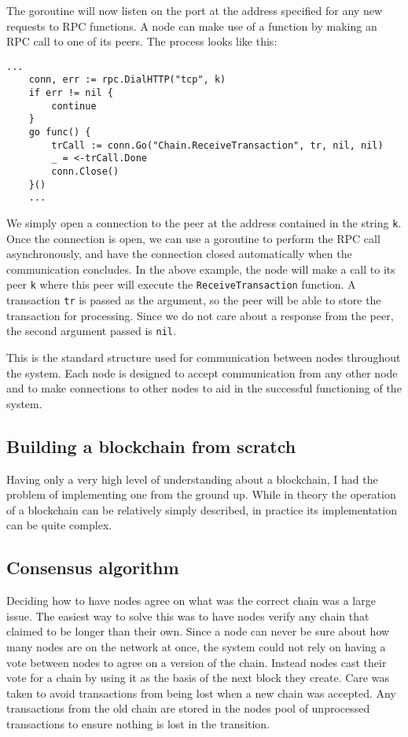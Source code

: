 \documentclass[a4paper,12pt]{article}
\begin{document}
The goroutine will now listen on the port at the address specified for any new requests to RPC functions. A node can make use of a function by making an RPC call to one of its peers. The process looks like this:
\begin{Verbatim}[obeytabs,tabsize=4]
    ...
    conn, err := rpc.DialHTTP("tcp", k)
    if err != nil {
        continue
    }
    go func() {
        trCall := conn.Go("Chain.ReceiveTransaction", tr, nil, nil)
        _ = <-trCall.Done
        conn.Close()
    }()
    ...
\end{Verbatim}
We simply open a connection to the peer at the address contained in the string \verb|k|. Once the connection is open, we can use a goroutine to perform the RPC call asynchronously, and have the connection closed automatically when the communication concludes. In the above example, the node will make a call to its peer \verb|k| where this peer will execute the \verb|ReceiveTransaction| function. A transaction \verb|tr| is passed as the argument, so the peer will be able to store the transaction for processing. Since we do not care about a response from the peer, the second argument passed is \verb|nil|.

This is the standard structure used for communication between nodes throughout the system. Each node is designed to accept communication from any other node and to make connections to other nodes to aid in the successful functioning of the system.

\subsection{Building a blockchain from scratch}
Having only a very high level of understanding about a blockchain, I had the problem of implementing one from the ground up. While in theory the operation of a blockchain can be relatively simply described, in practice its implementation can be quite complex.

\subsection{Consensus algorithm}
Deciding how to have nodes agree on what was the correct chain was a large issue. The easiest way to solve this was to have nodes verify any chain that claimed to be longer than their own. Since a node can never be sure about how many nodes are on the network at once, the system could not rely on having a vote between nodes to agree on a version of the chain. Instead nodes cast their vote for a chain by using it as the basis of the next block they create. Care was taken to avoid transactions from being lost when a new chain was accepted. Any transactions from the old chain are stored in the nodes pool of unprocessed transactions to ensure nothing is lost in the transition.
\end{document}
